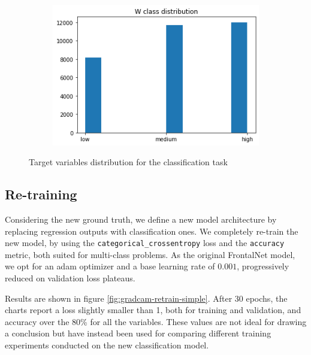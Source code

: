 \begin{figure}[!h]
\begin{center}
\begin{subfigure}[h]{0.24\textwidth}
		\end{subfigure}
		\hfill
		\begin{subfigure}[h]{0.24\textwidth}
			\centering
			\includegraphics[width=1\textwidth]{"contents/images/distributions/w-class"}
		\end{subfigure}
	\end{center}
	\vspace{-0.5cm}
	\caption[Target variables distribution for the classification task]{Target variables distribution for the classification task}
	\label{fig:frontalnet-dataset-distribution-class}
\end{figure}



\subsection{Re-training}
\label{subsec:gradcam-retrain}

Considering the new ground truth, we define a new model architecture by replacing regression outputs with classification ones. We completely re-train the new model, by using the \texttt{categorical\_crossentropy} loss and the \texttt{accuracy} metric, both suited for multi-class problems. As the original FrontalNet model, we opt for an \gls{adam} optimizer and a base learning rate of $0.001$, progressively reduced on validation loss plateaus. 

Results are shown in figure \ref{fig:gradcam-retrain-simple}. After 30 epochs, the charts report a loss slightly smaller than 1, both for training and validation, and accuracy over the 80\% for all the variables. These values are not ideal for drawing a conclusion but have instead been used for comparing different training experiments conducted on the new classification model.

